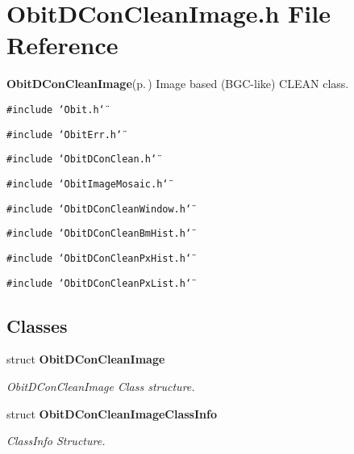 \section{Obit\-DCon\-Clean\-Image.h File Reference}
\label{ObitDConCleanImage_8h}
{\bf Obit\-DCon\-Clean\-Image}{\rm (p.\,\pageref{structObitDConCleanImage})} Image based (BGC-like) CLEAN class. 

{\tt \#include \char`\"{}Obit.h\char`\"{}}\par
{\tt \#include \char`\"{}Obit\-Err.h\char`\"{}}\par
{\tt \#include \char`\"{}Obit\-DCon\-Clean.h\char`\"{}}\par
{\tt \#include \char`\"{}Obit\-Image\-Mosaic.h\char`\"{}}\par
{\tt \#include \char`\"{}Obit\-DCon\-Clean\-Window.h\char`\"{}}\par
{\tt \#include \char`\"{}Obit\-DCon\-Clean\-Bm\-Hist.h\char`\"{}}\par
{\tt \#include \char`\"{}Obit\-DCon\-Clean\-Px\-Hist.h\char`\"{}}\par
{\tt \#include \char`\"{}Obit\-DCon\-Clean\-Px\-List.h\char`\"{}}\par
\subsection*{Classes}
\begin{CompactItemize}
\item 
struct {\bf Obit\-DCon\-Clean\-Image}
\begin{CompactList}\small\item\em Obit\-DCon\-Clean\-Image Class structure. \item\end{CompactList}\item 
struct {\bf Obit\-DCon\-Clean\-Image\-Class\-Info}
\begin{CompactList}\small\item\em Class\-Info Structure. \item\end{CompactList}\end{CompactItemize}
